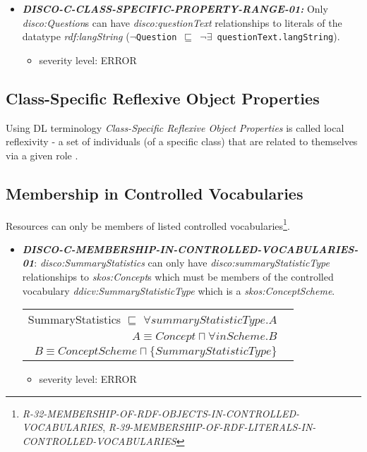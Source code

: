 \documentclass{llncs}
\newcommand{\ms}[1]{\texttt{#1}}
\newenvironment{DL}{
  \vspace{0cm}
  \begin{tabular}{r l}

}{
  \end{tabular}
}
\begin{document}
\begin{itemize}
	\item \textbf{{\em DISCO-C-CLASS-SPECIFIC-PROPERTY-RANGE-01:}}
Only {\em disco:Question}s can have {\em disco:questionText} relationships to literals of the datatype {\em rdf:langString} (\ms{$\neg$Question $\sqsubseteq$ $\neg\exists$ questionText.langString}).
	\begin{itemize}
		\item severity level: ERROR
	\end{itemize}
\end{itemize}

\subsection{Class-Specific Reflexive Object Properties}

Using DL terminology \emph{Class-Specific Reflexive Object Properties} is called local reflexivity - a set of individuals (of a specific class) that are related to themselves via a given role \cite{Kroetzsch2012}.

\subsection{Membership in Controlled Vocabularies}

Resources can only be members of listed controlled vocabularies\footnote{{\em R-32-MEMBERSHIP-OF-RDF-OBJECTS-IN-CONTROLLED-VOCABULARIES}, 
{\em R-39-MEMBERSHIP-OF-RDF-LITERALS-IN-CONTROLLED-VOCABULARIES}}.

\begin{itemize}
	\item \textbf{{\em DISCO-C-MEMBERSHIP-IN-CONTROLLED-VOCABULARIES-01}}:
{\em disco:SummaryStatistics} can only have {\em disco:summaryStatisticType} relationships to {\em skos:Concept}s which must be members of the controlled vocabulary {\em ddicv:SummaryStatisticType} which is a {\em skos:ConceptScheme}.

\begin{DL}
SummaryStatistics $\sqsubseteq$ $\forall summaryStatisticType.A$ \\
$A \equiv Concept \sqcap \forall inScheme . B$ \\
$B \equiv ConceptScheme \sqcap \{SummaryStatisticType\}$
\end{DL}

\begin{itemize}
		\item severity level: ERROR
	\end{itemize}
\end{itemize}
\end{document}
